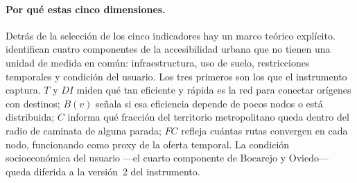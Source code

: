 \paragraph{Por qué estas cinco dimensiones.}
\label{subsubsec:garibelt-dimensiones}

Detrás de la selección de los cinco indicadores hay un marco teórico explícito.
\citet{bocarejo2012} identifican cuatro componentes de la accesibilidad urbana
que no tienen una unidad de medida en común: infraestructura, uso de suelo,
restricciones temporales y condición del usuario. Los tres primeros son los que
el instrumento captura. $T$ y $DI$ miden qué tan eficiente y rápida es la red
para conectar orígenes con destinos; $B(v)$ señala si esa eficiencia depende de
pocos nodos o está distribuida; $C$ informa qué fracción del territorio
metropolitano queda dentro del radio de caminata de alguna parada; $FC$ refleja
cuántas rutas convergen en cada nodo, funcionando como proxy de la oferta
temporal. La condición socioeconómica del usuario ---el cuarto componente de
Bocarejo y Oviedo--- queda diferida a la versión~2 del instrumento.
